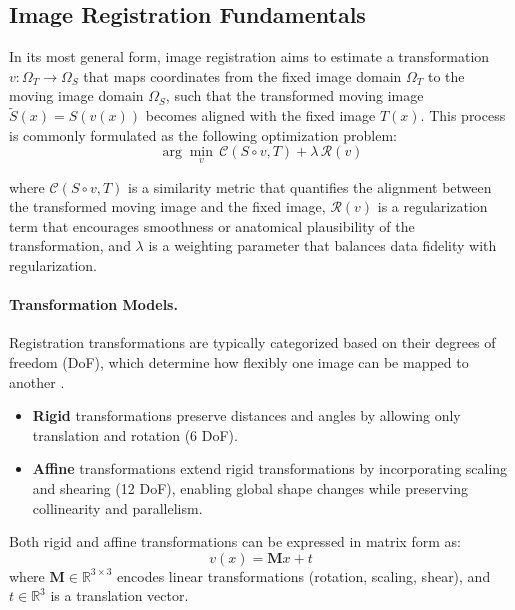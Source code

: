 \subsection{Image Registration Fundamentals}
In its most general form, image registration aims to estimate a transformation \( v: \Omega_T \rightarrow \Omega_S \) that maps coordinates from the fixed image domain \( \Omega_T \) to the moving image domain \( \Omega_S \), such that the transformed moving image \( \tilde{S}(x) = S(v(x)) \) becomes aligned with the fixed image \( T(x) \). This process is commonly formulated as the following optimization problem:
\begin{equation}
    \arg\min_{v} \, \mathcal{C}(S \circ v, T) + \lambda \, \mathcal{R}(v)
    \label{eq:registration_loss}
\end{equation}

where \( \mathcal{C}(S \circ v, T) \) is a similarity metric that quantifies the alignment between the transformed moving image and the fixed image, \( \mathcal{R}(v) \) is a regularization term that encourages smoothness or anatomical plausibility of the transformation, and \( \lambda \) is a weighting parameter that balances data fidelity with regularization.

\paragraph{Transformation Models.}
Registration transformations are typically categorized based on their degrees of freedom (DoF), which determine how flexibly one image can be mapped to another \cite{Chen2023-wx, Zitova2003-ds, Maintz1998-gs}.

\begin{itemize}
    \item \textbf{Rigid} transformations preserve distances and angles by allowing only translation and rotation (6 DoF).
    
    \item \textbf{Affine} transformations extend rigid transformations by incorporating scaling and shearing (12 DoF), enabling global shape changes while preserving collinearity and parallelism.
\end{itemize}

Both rigid and affine transformations can be expressed in matrix form as:
\begin{equation}
    v(x) = \mathbf{M}x + t
    \label{eq:affine}
\end{equation}
where \( \mathbf{M} \in \mathbb{R}^{3 \times 3} \) encodes linear transformations (rotation, scaling, shear), and \( t \in \mathbb{R}^3 \) is a translation vector. 

